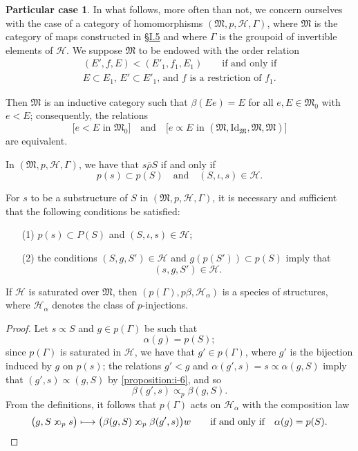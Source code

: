 \documentclass[a4paper,fleqn]{article}
\theoremstyle{plain}
\newenvironment{proposition}[1]
  {\renewcommand\theinnerproposition{#1}\innerproposition}
  {\endinnerproposition}
\theoremstyle{definition}
\newtheorem*{particular}{Particular case}
\newcommand{\oldpage}[1]{{\marginpar{\footnotesize$\bigg\vert$\,\,\,\,\textit{p.~#1}}}}
\newcommand{\textand}{\quad\text{and}\quad}
\newcommand{\HH}{\mathcal{H}}
\newcommand{\MM}{\mathfrak{M}}
\newcommand{\relrhobar}{\mathrel{\bar{\rho}}}
\newcommand{\subs}{\mathrel{\propto}}
\newcommand{\sups}{\mathrel{\reflectbox{$\propto$}}}
\newcommand{\Id}{\mathrm{Id}}
\begin{document}
\begin{particular}
  In what follows, more often than not, we concern ourselves with the case of a category of homomorphisms $(\MM,p,\HH,\Gamma)$, where $\MM$ is the category of maps constructed in \hyperref[section:i.5]{§I.5} and where $\Gamma$ is the groupoid of invertible elements of $\HH$.
  We suppose $\MM$ to be endowed with the order relation
  \[
    \begin{gathered}
      (E',f,E) < (E'_1,f_1,E_1)
      \qquad\text{if and only if}
    \\\text{$E\subset E_1$, $E'\subset E'_1$, and $f$ is a restriction of $f_1$.}
    \end{gathered}
  \]

  Then $\MM$ is an inductive category such that $\beta(Ee)=E$ for all $e,E\in\MM_0$ with $e<E$;
  consequently, the relations
  \[
    \big[\text{$e<E$ in $\MM_0$}\big]
    \textand
    \big[\text{$e\subs E$ in $(\MM,\Id_\MM,\MM,\MM)$}\big]
  \]
  are equivalent.

  In $(\MM,p,\HH,\Gamma)$, we have that $s\relrhobar S$ if and only if
  \[
    p(s)\subset p(S)
    \textand
    (S,\iota,s)\in\HH.
  \]

  For $s$ to be a substructure of $S$ in $(\MM,p,\HH,\Gamma)$, it is necessary and sufficient that the following conditions be satisfied:
  \begin{enumerate}
    \item[\normalfont(1)]
      $p(s)\subset P(S)$ and $(S,\iota,s)\in\HH$;
    \item[\normalfont(2)]
      the conditions $(S,g,S')\in\HH$ and $g(p(S'))\subset p(S)$ imply that
      \[
        (s,g,S')\in\HH.
      \]
  \end{enumerate}
\end{particular}

\begin{proposition}{15}
  If $\HH$ is saturated over $\MM$, then $(p(\Gamma),p\beta,\HH_\alpha)$ is a species of structures, where $\HH_\alpha$ denotes the class of $p$-injections.
\end{proposition}

\begin{proof}
  Let $s\subs S$ and $g\in p(\Gamma)$ be such that
  \[
    \alpha(g)
    = p(S);
  \]
  since $p(\Gamma)$ is saturated in $\HH$, we have that $g'\in p(\Gamma)$, where $g'$ is the bijection induced by $g$ on $p(s)$;
  the relations $g'<g$ and $\alpha(g',s)=s\subs\alpha(g,S)$ imply that $(g',s)\subs(g,S)$ by \cref{proposition:i-6}, and so
  \[
    \beta(g',s)
    \subs_p \beta(g,S).
  \]
  \oldpage{380}
  From the definitions, it follows that $p(\Gamma)$ acts on $\HH_\alpha$ with the composition law
  \[
    \big(
      g, S\sups_p s
    \big)
    \longmapsto
    \big(
      \beta(g,S) \sups_p \beta(g',s)
    \big)w
    \qquad\text{if and only if}\quad
    \alpha(g)=p(S).
    \qedhere
  \]
\end{proof}
\end{document}
